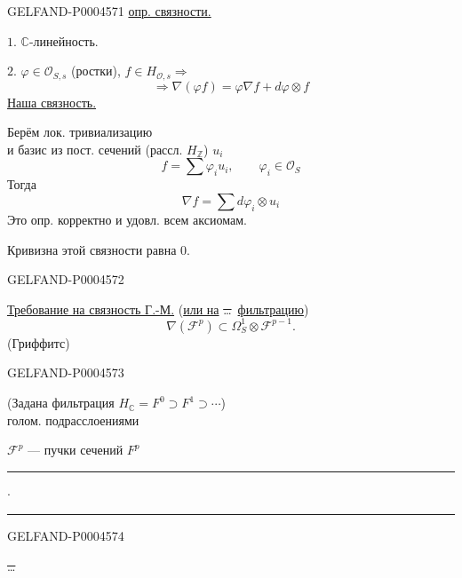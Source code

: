 \begin{GelfandAdjacentEvidence}{GELFAND-P000457}{1}
\underline{опр. связности.}

$1.$ $\mathbb C$-линейность.

$2.$ $\varphi\in\mathcal O_{S,s}$ (ростки), $f\in H_{\mathcal O,s}\Rightarrow$
\[
\Rightarrow\nabla(\varphi f)=\varphi\nabla f+d\varphi\otimes f
\]
\underline{Наша связность.}

Берём лок. тривиализацию\\
и базис из пост. сечений (рассл. $H_{\mathbb Z}$) $u_i$
\[
f=\sum\varphi_i u_i,\qquad\varphi_i\in\mathcal O_S
\]
Тогда
\[
\nabla f=\sum d\varphi_i\otimes u_i
\]
Это опр. корректно и удовл. всем аксиомам.

Кривизна этой связности равна $0$.
\end{GelfandAdjacentEvidence}
\begin{GelfandAdjacentEvidence}{GELFAND-P000457}{2}


\underline{Требование на связность Г.-М.}\quad
(\underline{или на} \sout{\ldots}\ \underline{фильтрацию})
\[
\nabla(\mathcal F^p)\subset\Omega_S^1\otimes\mathcal F^{p-1}.
\]
\hfill(Гриффитс)\par
{}
\end{GelfandAdjacentEvidence}
\begin{GelfandAdjacentEvidence}{GELFAND-P000457}{3}


(Задана фильтрация $H_{\mathbb C}=F^0\supset F^1\supset\cdots$)\\
\hspace*{4em}голом. подрасслоениями

$\mathcal F^p$ — пучки сечений $F^p$

\begin{center}
\rule[.5ex]{15mm}{.35pt}\enspace$\cdot$\enspace\rule[.5ex]{22mm}{.35pt}
\end{center}

\end{GelfandAdjacentEvidence}
\begin{GelfandAdjacentEvidence}{GELFAND-P000457}{4}


\sout{\ldots}
\end{GelfandAdjacentEvidence}
